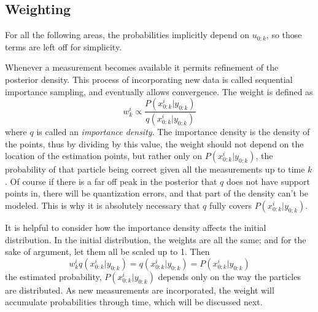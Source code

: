 \subsection{Weighting}
For all the following areas, the probabilities implicitly depend on $u_{0:k}$, 
so those terms are left off for simplicity.

Whenever a measurement becomes available it permits refinement of the
posterior density.
This process of incorporating new data is called sequential importance sampling,
and eventually allows convergence. The weight is defined as
\begin{equation}
w^i_k \propto \frac{P(x^i_{0:k} | y_{0:k})}{q(x^i_{0:k} | y_{0:k})}
\label{eq:weightfunc}
\end{equation}
where $q$ is called an \emph{importance density}. The importance density
is the density of the points, thus by dividing by this value, the weight
should not depend on the location of the estimation points, but rather
only on $P(x^i_{0:k} | y_{0:k})$, the probability of that particle
being correct given all the measurements up to time $k$. 
Of course if there is a far off peak in
the posterior that $q$ does not have support points in, there will 
be quantization errors, and that part of the density can't be modeled. This is why
it is absolutely necessary that $q$ fully covers $P(x^i_{0:k} | y_{0:k})$.

It is helpful
to consider how the importance density affects the initial distribution. 
In the initial distribution, the weights are all the same; and for
the sake of argument, let them all be scaled up to 1. Then
\begin{equation}
w^i_k q(x^i_{0:k} | y_{0:k}) = q(x^i_{0:k} | y_{0:k}) = P(x^i_{0:k} | y_{0:k})
\end{equation}
the estimated probability, $P(x^i_{0:k} | y_{0:k})$ depends only on the 
way the particles are distributed. As new measurements are incorporated,
the weight will accumulate probabilities through time, which will be discussed
next. 

